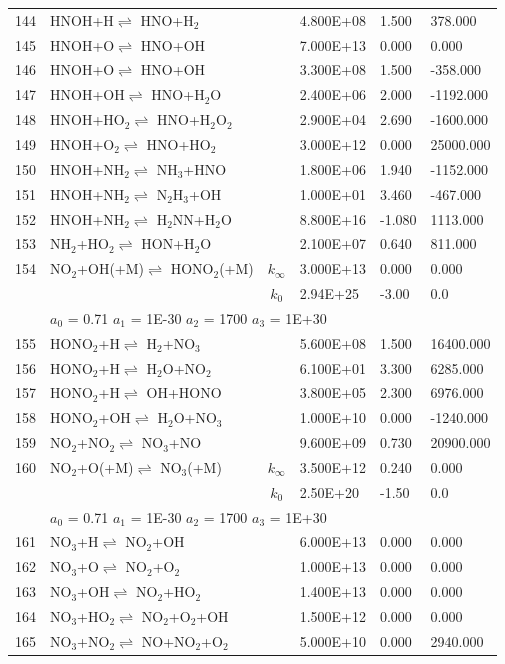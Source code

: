 \documentclass[11pt]{article}
\begin{document}
\begin{table}[hbt]
\begin{tabular}{|r l c l l l|}
144 &	HNOH+H$\rightleftharpoons$ HNO+H$_{2}$&	&	4.800E+08&	1.500&	378.000\\ 
145 &	HNOH+O$\rightleftharpoons$ HNO+OH&	&	7.000E+13&	0.000&	0.000\\ 
146 &	HNOH+O$\rightleftharpoons$ HNO+OH&	&	3.300E+08&	1.500&	-358.000\\ 
147 &	HNOH+OH$\rightleftharpoons$ HNO+H$_{2}$O&	&	2.400E+06&	2.000&	-1192.000\\ 
148 &	HNOH+HO$_{2}$$\rightleftharpoons$ HNO+H$_{2}$O$_{2}$&	&	2.900E+04&	2.690&	-1600.000\\ 
149 &	HNOH+O$_{2}$$\rightleftharpoons$ HNO+HO$_{2}$&	&	3.000E+12&	0.000&	25000.000\\ 
150 &	HNOH+NH$_{2}$$\rightleftharpoons$ NH$_{3}$+HNO&	&	1.800E+06&	1.940&	-1152.000\\ 
151 &	HNOH+NH$_{2}$$\rightleftharpoons$ N$_{2}$H$_{3}$+OH&	&	1.000E+01&	3.460&	-467.000\\ 
152 &	HNOH+NH$_{2}$$\rightleftharpoons$ H$_{2}$NN+H$_{2}$O&	&	8.800E+16&	-1.080&	1113.000\\ 
153 &	NH$_{2}$+HO$_{2}$$\rightleftharpoons$ HON+H$_{2}$O&	&	2.100E+07&	0.640&	811.000\\ 
154 &	NO$_{2}$+OH(+M)$\rightleftharpoons$ HONO$_{2}$(+M)&	$k_{\infty}$&	3.000E+13&	0.000&	0.000\\ 
	&	&	$k_0$&	2.94E+25&-3.00&	    0.0\\ 
	&\multicolumn{5}{l|}{	$a_0$ = 0.71	$a_1$ = 1E-30	$a_2$ = 1700	$a_3$ = 1E+30}\\ 
155 &	HONO$_{2}$+H$\rightleftharpoons$ H$_{2}$+NO$_{3}$&	&	5.600E+08&	1.500&	16400.000\\ 
156 &	HONO$_{2}$+H$\rightleftharpoons$ H$_{2}$O+NO$_{2}$&	&	6.100E+01&	3.300&	6285.000\\ 
157 &	HONO$_{2}$+H$\rightleftharpoons$ OH+HONO&	&	3.800E+05&	2.300&	6976.000\\ 
158 &	HONO$_{2}$+OH$\rightleftharpoons$ H$_{2}$O+NO$_{3}$&	&	1.000E+10&	0.000&	-1240.000\\ 
159 &	NO$_{2}$+NO$_{2}$$\rightleftharpoons$ NO$_{3}$+NO&	&	9.600E+09&	0.730&	20900.000\\ 
160 &	NO$_{2}$+O(+M)$\rightleftharpoons$ NO$_{3}$(+M)&	$k_{\infty}$&	3.500E+12&	0.240&	0.000\\ 
	&	&	$k_0$&	2.50E+20&-1.50&	    0.0\\ 
	&\multicolumn{5}{l|}{	$a_0$ = 0.71	$a_1$ = 1E-30	$a_2$ = 1700	$a_3$ = 1E+30}\\ 
161 &	NO$_{3}$+H$\rightleftharpoons$ NO$_{2}$+OH&	&	6.000E+13&	0.000&	0.000\\ 
162 &	NO$_{3}$+O$\rightleftharpoons$ NO$_{2}$+O$_{2}$&	&	1.000E+13&	0.000&	0.000\\ 
163 &	NO$_{3}$+OH$\rightleftharpoons$ NO$_{2}$+HO$_{2}$&	&	1.400E+13&	0.000&	0.000\\ 
164 &	NO$_{3}$+HO$_{2}$$\rightleftharpoons$ NO$_{2}$+O$_{2}$+OH&	&	1.500E+12&	0.000&	0.000\\ 
165 &	NO$_{3}$+NO$_{2}$$\rightleftharpoons$ NO+NO$_{2}$+O$_{2}$&	&	5.000E+10&	0.000&	2940.000\\ 
\hline
\end{tabular} 
\end{table} 
\end{document}
